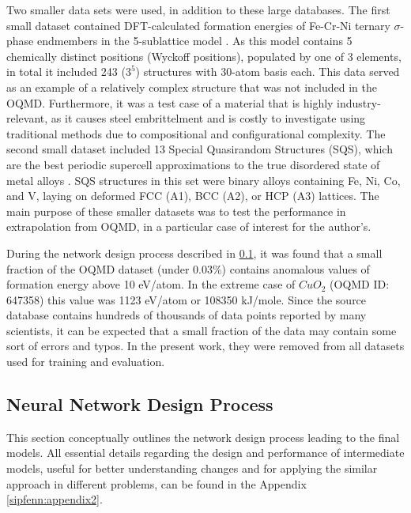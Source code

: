 Two smaller data sets were used, in addition to these large databases. The first small dataset contained DFT-calculated formation energies of Fe-Cr-Ni ternary $\sigma$-phase endmembers in the 5-sublattice model \cite{Feurer2019Cr-Fe-NiCalculations}. As this model contains 5 chemically distinct positions (Wyckoff positions), populated by one of 3 elements, in total it included 243 ($3^5$) structures with 30-atom basis each. This data served as an example of a relatively complex structure that was not included in the OQMD. Furthermore, it was a test case of a material that is highly industry-relevant, as it causes steel embrittelment \cite{Hsieh2012OverviewSteels} and is costly to investigate using traditional methods due to compositional and configurational complexity. The second small dataset included 13 Special Quasirandom Structures (SQS), which are the best periodic supercell approximations to the true disordered state of metal alloys \cite{Zunger1990SpecialStructures, Jiang2004First-principlesStructures, Shin2006ThermodynamicStructures}. SQS structures in this set were binary alloys containing Fe, Ni, Co, and V, laying on deformed FCC (A1), BCC (A2), or HCP (A3) lattices. The main purpose of these smaller datasets was to test the performance in extrapolation from OQMD, in a particular case of interest for the author's.

During the network design process described in \ref{sipfenn:sssec:NetDesign}, it was found that a small fraction of the OQMD dataset (under 0.03\%) contains anomalous values of formation energy above 10 eV/atom. In the extreme case of $CuO_2$ (OQMD ID: 647358) this value was 1123 eV/atom or 108350 kJ/mole. Since the source database contains hundreds of thousands of data points reported by many scientists, it can be expected that a small fraction of the data may contain some sort of errors and typos. In the present work, they were removed from all datasets used for training and evaluation.

\subsection{Neural Network Design Process} \label{sipfenn:sssec:NetDesign}

This section conceptually outlines the network design process leading to the final models. All essential details regarding the design and performance of intermediate models, useful for better understanding changes and for applying the similar approach in different problems, can be found in the Appendix \ref{sipfenn:appendix2}.

